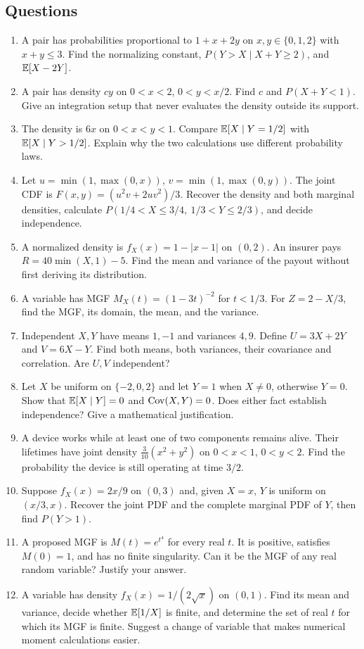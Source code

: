 \subsection*{Questions}
\begin{enumerate}[label=\textbf{T\arabic*.},leftmargin=*,itemsep=0.65em]
\item A pair has probabilities proportional to $1+x+2y$ on $x,y\in\{0,1,2\}$ with $x+y\le3$. Find the normalizing constant, $P(Y>X\mid X+Y\ge2)$, and $\mathbb E[X-2Y]$.
\item A pair has density $cy$ on $0<x<2$, $0<y<x/2$. Find $c$ and $P(X+Y<1)$. Give an integration setup that never evaluates the density outside its support.
\item The density is $6x$ on $0<x<y<1$. Compare $\mathbb E[X\mid Y=1/2]$ with $\mathbb E[X\mid Y>1/2]$. Explain why the two calculations use different probability laws.
\item Let $u=\min(1,\max(0,x))$, $v=\min(1,\max(0,y))$. The joint CDF is $F(x,y)=(u^2v+2uv^2)/3$. Recover the density and both marginal densities, calculate $P(1/4<X\le3/4,\ 1/3<Y\le2/3)$, and decide independence.
\item A normalized density is $f_X(x)=1-|x-1|$ on $(0,2)$. An insurer pays $R=40\min(X,1)-5$. Find the mean and variance of the payout without first deriving its distribution.
\item A variable has MGF $M_X(t)=(1-3t)^{-2}$ for $t<1/3$. For $Z=2-X/3$, find the MGF, its domain, the mean, and the variance.
\item Independent $X,Y$ have means $1,-1$ and variances $4,9$. Define $U=3X+2Y$ and $V=6X-Y$. Find both means, both variances, their covariance and correlation. Are $U,V$ independent?
\item Let $X$ be uniform on $\{-2,0,2\}$ and let $Y=1$ when $X\ne0$, otherwise $Y=0$. Show that $\mathbb E[X\mid Y]=0$ and $\operatorname{Cov}(X,Y)=0$. Does either fact establish independence? Give a mathematical justification.
\item A device works while at least one of two components remains alive. Their lifetimes have joint density $\frac3{10}(x^2+y^2)$ on $0<x<1$, $0<y<2$. Find the probability the device is still operating at time $3/2$.
\item Suppose $f_X(x)=2x/9$ on $(0,3)$ and, given $X=x$, $Y$ is uniform on $(x/3,x)$. Recover the joint PDF and the complete marginal PDF of $Y$, then find $P(Y>1)$.
\item A proposed MGF is $M(t)=e^{t^4}$ for every real $t$. It is positive, satisfies $M(0)=1$, and has no finite singularity. Can it be the MGF of any real random variable? Justify your answer.
\item A variable has density $f_X(x)=1/(2\sqrt{x})$ on $(0,1)$. Find its mean and variance, decide whether $\mathbb E[1/X]$ is finite, and determine the set of real $t$ for which its MGF is finite. Suggest a change of variable that makes numerical moment calculations easier.
\end{enumerate}

